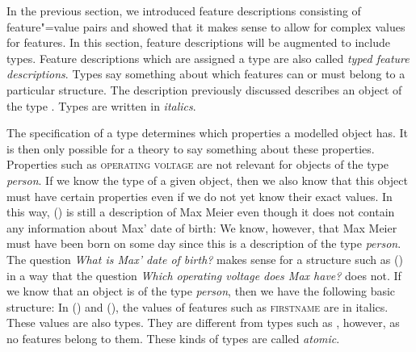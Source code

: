 \addlines
In the previous section, we introduced feature descriptions consisting of feature"=value pairs and showed that it makes sense to allow for
complex values for features. In this section, feature descriptions will be augmented to include types. Feature descriptions which are assigned a type
are also called \emph{typed feature descriptions}. Types say something about which features can or must belong to a 
particular structure. The description previously discussed describes an object of the type .
\ea
{}
\z
Types are written in \textit{italics}. 

The specification of a type determines which properties a modelled object has. It is then only
possible for a theory to say something about these properties.
Properties such as \textsc{operating voltage} are not relevant for objects of the type \textit{person}. If we know the type of a given object, then we
also know that this object must have certain properties even if we do not yet know their exact values. In this way, () is still a description of
Max Meier even though it does not contain any information about Max' date of birth:
\ea
{}
\z
We know, however, that Max Meier must have been born on some day since this is a description of the type \textit{person}.
The question \emph{What is Max' date of birth?} makes sense for a structure such as () in a way that the question
\emph{Which operating voltage does Max have?} does not. If we know that an object is of the type \textit{person}, then we have
the following basic structure:
\ea
{}
\z
In () and (), the values of features such as \textsc{firstname} are in italics. These values are also types. They are different from
types such as , however, as no features belong to them. These kinds of types are called \emph{atomic}.

